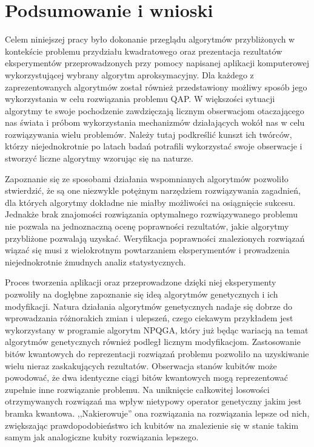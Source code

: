 \chapter{Podsumowanie i wnioski}
\label{cha:wnioski}
Celem niniejszej pracy było dokonanie przeglądu algorytmów przybliżonych w kontekście problemu przydziału kwadratowego oraz prezentacja rezultatów eksperymentów przeprowadzonych przy pomocy napisanej aplikacji komputerowej wykorzystującej wybrany algorytm aproksymacyjny. Dla każdego z zaprezentowanych algorytmów został również przedstawiony możliwy sposób jego wykorzystania w celu rozwiązania problemu QAP. W większości sytuacji algorytmy te swoje pochodzenie zawdzięczają licznym obserwacjom otaczającego nas świata i próbom wykorzystania mechanizmów działających wokół nas w celu rozwiązywania wielu problemów. Należy tutaj podkreślić kunszt ich twórców, którzy niejednokrotnie po latach badań potrafili wykorzystać swoje obserwacje i stworzyć liczne algorytmy wzorując się na naturze.

Zapoznanie się ze sposobami działania wspomnianych algorytmów pozwoliło stwierdzić, że są one niezwykle potężnym narzędziem rozwiązywania zagadnień, dla których algorytmy dokładne nie miałby możliwości na osiągnięcie sukcesu. Jednakże brak znajomości rozwiązania optymalnego rozwiązywanego problemu nie pozwala na jednoznaczną ocenę poprawności rezultatów, jakie algorytmy przybliżone pozwalają uzyskać. Weryfikacja poprawności znalezionych rozwiązań wiązać się musi z wielokrotnym powtarzaniem eksperymentów i prowadzenia niejednokrotnie żmudnych analiz statystycznych. 

Proces tworzenia aplikacji oraz przeprowadzone dzięki niej eksperymenty pozwoliły na dogłębne zapoznanie się ideą algorytmów genetycznych i ich modyfikacji. Natura działania algorytmów genetycznych nadaje się dobrze do wprowadzania różnorakich zmian i ulepszeń, czego ciekawym przykładem jest wykorzystany w programie algorytm NPQGA, który już będąc wariacją na temat algorytmów genetycznych również podległ licznym modyfikacjom. Zastosowanie bitów kwantowych do reprezentacji rozwiązań problemu pozwoliło na uzyskiwanie wielu nieraz zaskakujących rezultatów. Obserwacja stanów kubitów może powodować, że dwa identyczne ciągi bitów kwantowych mogą reprezentować zupełnie inne rozwiązanie problemu. Na uniknięcie całkowitej losowości otrzymywanych rozwiązań ma wpływ nietypowy operator genetyczny jakim jest bramka kwantowa. ,,Nakierowuje'' ona rozwiązania na rozwiązania lepsze od nich, zwiększając prawdopodobieństwo ich kubitów na znalezienie się w stanie takim samym jak analogiczne kubity rozwiązania lepszego.

